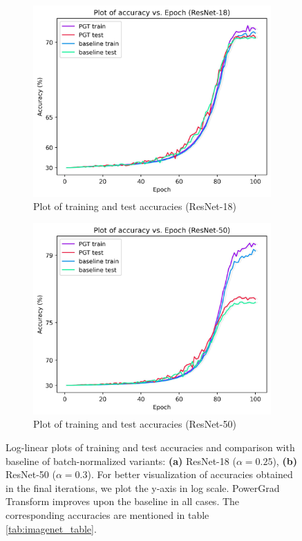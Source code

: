 \documentclass[times,sort&compress]{elsarticle}
\begin{document}
\begin{figure}[!t]
\centering
\begin{subfigure}{.5\columnwidth}
\centering
\includegraphics[width=0.9\columnwidth]{acc_vs_epoch_r18}
\caption{Plot of training and test accuracies (ResNet-18)}
\end{subfigure}%
\begin{subfigure}{.5\columnwidth}
\centering
\includegraphics[width=0.9\columnwidth]{acc_vs_epoch_r50}
\caption{Plot of training and test accuracies (ResNet-50)}
\end{subfigure}
\caption{ Log-linear plots of training and test accuracies and comparison with baseline
of batch-normalized variants: \textbf{(a)} ResNet-18 ($\alpha=0.25$), \textbf{(b)}
ResNet-50 ($\alpha=0.3$). For better visualization of accuracies obtained in the final
iterations, we plot the y-axis in log scale. PowerGrad Transform improves upon the
baseline in all cases. The corresponding accuracies are mentioned in table
\ref{tab:imagenet_table}. }
\label{fig:metrics}
\end{figure}
\end{document}

